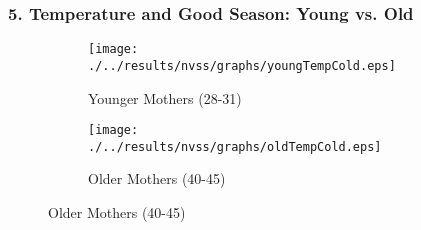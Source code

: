 \documentclass[10pt,letterpaper,subeqn]{beamer}
\begin{document}


\begin{frame}
\frametitle{5. Temperature and Good Season: Young vs. Old}
\begin{figure}[htpb!]
\begin{center}
\caption{Prevalence of Good Season and Cold Temperatures}
\label{fig:tempUSA}
\begin{subfigure}{.5\textwidth}
  \centering
  \texttt{[image: ./../results/nvss/graphs/youngTempCold.eps]}
  \caption{Younger Mothers (28-31)}
  \label{fig:tempUSAYoung}
\end{subfigure}%
\begin{subfigure}{.5\textwidth}
  \centering
  \texttt{[image: ./../results/nvss/graphs/oldTempCold.eps]}
  \caption{Older Mothers (40-45)}
  \label{fig:tempUSAOld}
\end{subfigure}
\end{center}
\end{figure}
\end{frame}
\end{document}
